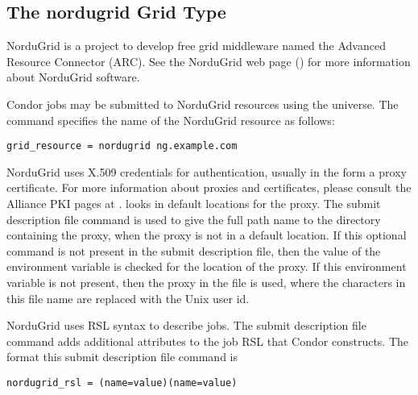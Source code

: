 
\subsection{\label{sec:NorduGrid}The nordugrid Grid Type }

NorduGrid is a project to develop free grid middleware named
the Advanced  Resource Connector (ARC).
See the NorduGrid web page ()
for more information about NorduGrid software.

Condor jobs may be submitted to
NorduGrid resources using the  universe.
The  command specifies the name of the
NorduGrid resource as follows:
\begin{verbatim}
grid_resource = nordugrid ng.example.com
\end{verbatim}

NorduGrid uses X.509 credentials for authentication,
usually in the form a proxy certificate. 
For more information about proxies and certificates,
please consult the Alliance PKI pages at
.
 looks in default locations for the proxy. 
The submit description file command 
is used to give the full path name to the directory containing the proxy,
when the proxy is not in a default location.
If this optional command is not present in the submit description file,
then the value of the environment variable
 is checked for the location of the proxy.
If this environment variable is not present, then 
the proxy in the file
 is used,
where the characters \verb@XXXX@ in this file name are
replaced with the Unix user id.

NorduGrid uses RSL syntax to describe jobs.
The submit description file command
adds additional attributes to the job RSL that Condor
constructs. 
The format this submit description file command is
\begin{verbatim}
nordugrid_rsl = (name=value)(name=value)
\end{verbatim}
